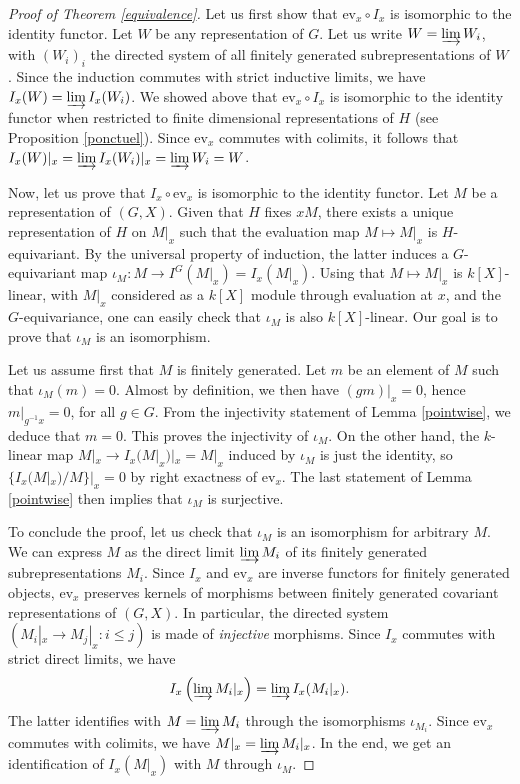 \documentclass{amsart}
\theoremstyle{definition}
\begin{document}
\begin{proof}[Proof of Theorem \ref{equivalence}]
    Let us first show that $\mathrm{ev}_x \circ I_x$ is isomorphic to the identity functor. Let $W$ be any representation of $G$. Let us write $W = \varinjlim W_i$, with $(W_i)_i$ the directed system of all finitely generated subrepresentations of $W$. Since the induction commutes with strict inductive limits, we have $I_x(W) = \varinjlim I_x(W_i)$. We showed above that $\mathrm{ev}_x \circ I_x$ is isomorphic to the identity functor when restricted to finite dimensional representations of $H$ (see Proposition \ref{ponctuel}). Since $\mathrm{ev}_x$ commutes with colimits, it follows that $I_x(W)|_x = \varinjlim I_x(W_i)|_x = \varinjlim W_i = W$.
    
    Now, let us prove that $I_x \circ \mathrm{ev}_x$ is isomorphic to the identity functor. Let $M$ be a representation of $(G,X)$. Given that $H$ fixes $x M$, there exists a unique representation of $H$ on $M|_x$ such that the evaluation map $M \mapsto M|_x$ is $H$-equivariant. By the universal property of induction, the latter induces a $G$-equivariant map $\iota_M : M \to I^G(M|_x) = I_x(M|_x)$. Using that $M \mapsto M|_x$ is $k[X]$-linear, with $M|_x$ considered as a $k[X]$ module through evaluation at $x$, and the $G$-equivariance, one can easily check that $\iota_M$ is also $k[X]$-linear. Our goal is to prove that $\iota_M$ is an isomorphism.
    
    Let us assume first that $M$ is finitely generated. Let $m$ be an element of $M$ such that $\iota_M(m) = 0$. Almost by definition, we then have $(gm)|_x = 0$, hence $m|_{g^{-1}x} = 0$, for all $g \in G$. From the injectivity statement of Lemma \ref{pointwise}, we deduce that $m = 0$. This proves the injectivity of $\iota_M$. On the other hand, the $k$-linear map $M|_x \to I_x(M|_x)|_x = M|_x$ induced by $\iota_M$ is just the identity, so
    $\{ I_x(M|_x) / M \}|_x = 0$
    by right exactness of $\mathrm{ev}_x$. The last statement of Lemma \ref{pointwise} then implies that $\iota_M$ is surjective.
    
    To conclude the proof, let us check that $\iota_M$ is an isomorphism for arbitrary $M$. We can express $M$ as the direct limit $\varinjlim M_i$ of its finitely generated subrepresentations $M_i$. Since $I_x$ and $\mathrm{ev}_x$ are inverse functors for finitely generated objects, $\mathrm{ev}_x$ preserves kernels of morphisms between finitely generated covariant representations of $(G,X)$. In particular, the directed system $(M_i|_x \to M_j|_x : i \leq j)$ is made of \textit{injective} morphisms. Since $I_x$ commutes with strict direct limits, we have
    $$I_x\left(\varinjlim M_i|_x\right) = \varinjlim I_x(M_i|_x).$$
    The latter identifies with $M = \varinjlim M_i$ through the isomorphisms $\iota_{M_i}$. Since $\mathrm{ev}_x$ commutes with colimits, we have $M|_x = \varinjlim M_i|_x$. In the end, we get an identification of $I_x(M|_x)$ with $M$ through $\iota_M$. \end{proof}
    
\end{document}
